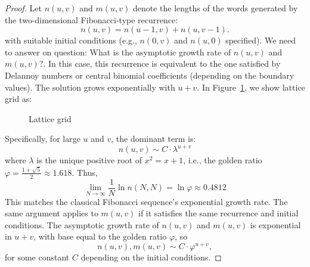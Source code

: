 \documentclass[12pt, a4paper]{article}
\begin{document}
\begin{proof}
Let $n(u, v)$ and $m(u, v)$ denote the lengths of the words generated by the two-dimensional Fibonacci-type recurrence:
$$
n(u, v) = n(u-1, v) + n(u, v-1).
$$
with suitable initial conditions (e.g., $n(0, v)$ and $n(u, 0)$ specified). We need to answer on question: What is the asymptotic growth rate of $n(u,v)$ and $m(u,v)$?. In this case, this recurrence is equivalent to the one satisfied by Delannoy numbers or central binomial coefficients (depending on the boundary values). The solution grows exponentially with $u+v$. In Figure~\ref{figlatticegrid}, we show lattice grid  as: 
\begin{figure}[H]
    \centering
{}
    \caption{Lattice grid}
    \label{figlatticegrid}
\end{figure}
Specifically, for large $u$ and $v$, the dominant term is:
$$
n(u, v) \sim C \cdot \lambda^{u+v}
$$
where $\lambda$ is the unique positive root of $x^2 = x + 1$, i.e., the golden ratio $\varphi = \frac{1+\sqrt{5}}{2} \approx 1.618$. Thus,
$$
\lim_{N \to \infty} \frac{1}{N} \ln n(N, N) = \ln \varphi \approx 0.4812
$$
This matches the classical Fibonacci sequence's exponential growth rate. The same argument applies to $m(u, v)$ if it satisfies the same recurrence and initial conditions.
The asymptotic growth rate of $n(u, v)$ and $m(u, v)$ is exponential in $u+v$, with base equal to the golden ratio $\varphi$, so
$$
n(u, v), m(u, v) \sim C \cdot \varphi^{u+v},
$$
for some constant $C$ depending on the initial conditions.
\end{proof}
\end{document}
